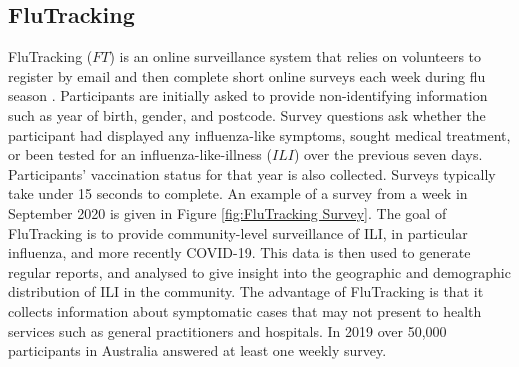 \subsection{FluTracking}
FluTracking ($FT$) is an online surveillance system that relies on volunteers to register by email and then complete short online surveys each week during flu season \cite{Moss et al 2019}.
Participants are initially asked to provide non-identifying information such as year of birth, gender, and postcode.
Survey questions ask whether the participant had displayed any influenza-like symptoms, sought medical treatment, or been tested for an influenza-like-illness ($ILI$) over the previous seven days. Participants' vaccination status for that year is also collected. Surveys typically take under 15 seconds to complete. An example of a survey from a week in September 2020 is given in Figure \ref{fig:FluTracking Survey}.
The goal of FluTracking is to provide community-level surveillance of ILI, in particular influenza, and more recently COVID-19. This data is then used to generate regular reports, and analysed to give insight into the geographic and demographic distribution of ILI in the community. The advantage of FluTracking is that it collects information about symptomatic cases that may not present to health services such as general practitioners and hospitals.
In 2019 over 50,000 participants in Australia answered at least one weekly survey.

